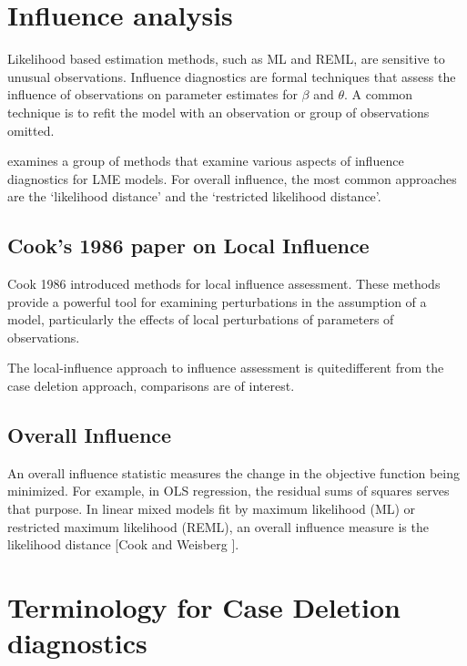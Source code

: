 \documentclass[12pt, a4paper]{report}
\theoremstyle{plain}
\theoremstyle{definition}
\theoremstyle{remark}
\begin{document}
\newpage
\section{Influence analysis} %

Likelihood based estimation methods, such as ML and REML, are sensitive to unusual observations. Influence diagnostics are formal techniques that assess the influence of observations on parameter estimates for $\beta$ and $\theta$. A common technique is to refit the model with an observation or group of observations omitted.

\citet{west} examines a group of methods that examine various aspects of influence diagnostics for LME models.
For overall influence, the most common approaches are the `likelihood distance' and the `restricted likelihood distance'.

\subsection{Cook's 1986 paper on Local Influence}%
Cook 1986 introduced methods for local influence assessment. These methods provide a powerful tool for examining perturbations in the assumption of a model, particularly the effects of local perturbations of parameters of observations.

The local-influence approach to influence assessment is quitedifferent from the case deletion approach, comparisons are of
interest.



\subsection{Overall Influence}
An overall influence statistic measures the change in the objective function being minimized. For example, in
OLS regression, the residual sums of squares serves that purpose. In linear mixed models fit by
 maximum likelihood (ML) or  restricted maximum likelihood (REML), an overall influence measure is the  likelihood distance [Cook and Weisberg ].

\newpage
\section{Terminology for Case Deletion diagnostics} %
\end{document}
